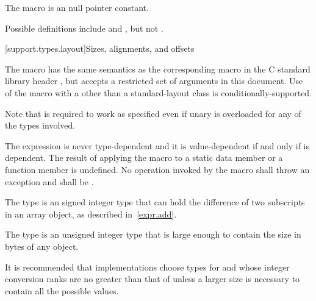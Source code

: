 \pnum
The macro
%
is an  null pointer constant.
\begin{footnote}
Possible definitions include
and
,
but not
.
\end{footnote}


[support.types.layout]{Sizes, alignments, and offsets}

\pnum
The macro
%
has the same semantics as the corresponding macro in
the C standard library header , but
accepts a restricted set of 
arguments in this document.
Use of the  macro with a 
other than a standard-layout class
is conditionally-supported.
\begin{footnote}
Note that 
is required to work as specified even if unary
is overloaded for any of the types involved.
\end{footnote}
The expression 
is never type-dependent and it is
value-dependent if and only if  is
dependent. The result of applying the  macro to
a static data member or a function member is undefined.
No operation invoked by the  macro shall throw an exception and
 shall be .

\pnum
The type  is an
signed integer type that can
hold the difference of two subscripts in an array object, as described in~\ref{expr.add}.

\pnum
The type  is an
unsigned integer type that is large enough
to contain the size in bytes of any object.

\pnum
\begin{note}
It is recommended that implementations choose types for  and 
whose integer conversion ranks are no greater than that of
 unless a larger size is necessary to contain all the possible values.
\end{note}

